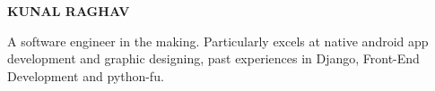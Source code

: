 \documentclass[10pt,a4paper]{extarticle}
\begin{document}
\noindent
	\begin{flushleft}
	\begin{LARGE}
		{
		\color{resumeBlueLight}
			\bfseries{ KUNAL RAGHAV} 
		}\\					
	\end{LARGE}
		\vspace{2mm}
		A software engineer in the making. Particularly excels at native android app development and graphic designing, past
		experiences in Django, Front-End Development and python-fu.
		\vspace{-1mm}


\end{flushleft}
\end{document}

